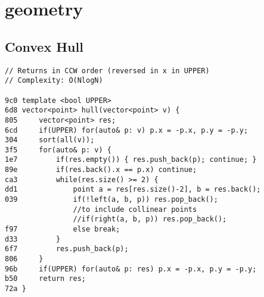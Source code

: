 \documentclass[11pt, a4paper, twoside]{article}
\begin{document}
%
%

\section{geometry}

\subsection{Convex Hull}
\begin{lstlisting}
// Returns in CCW order (reversed in x in UPPER)
// Complexity: O(NlogN)

9c0 template <bool UPPER>
6d8 vector<point> hull(vector<point> v) {
805 	vector<point> res;
6cd 	if(UPPER) for(auto& p: v) p.x = -p.x, p.y = -p.y;
304 	sort(all(v));
3f5 	for(auto& p: v) {
1e7 		if(res.empty()) { res.push_back(p); continue; }
89e 		if(res.back().x == p.x) continue;
ca3 		while(res.size() >= 2) {
dd1 			point a = res[res.size()-2], b = res.back();
039 			if(!left(a, b, p)) res.pop_back();
    			//to include collinear points
    			//if(right(a, b, p)) res.pop_back();
f97 			else break;
d33 		}
6f7 		res.push_back(p);
806 	}
96b 	if(UPPER) for(auto& p: res) p.x = -p.x, p.y = -p.y;
b50 	return res;
72a }
\end{lstlisting}
\end{document}
